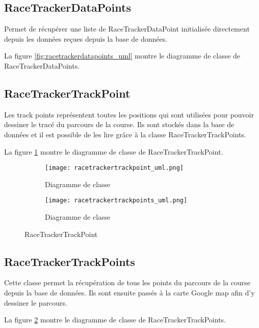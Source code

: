\subsection{RaceTrackerDataPoints}

Permet de récupérer une liste de RaceTrackerDataPoint initialisée directement depuis les données reçues depuis la base de données.

La figure \ref{fig:racetrackerdatapoints_uml} montre le diagramme de classe de RaceTrackerDataPoints.

\subsection{RaceTrackerTrackPoint}

Les track points représentent toutes les positions qui sont utilisées pour pouvoir dessiner le tracé du parcours de la course. Ils sont stockés dans la base de données et il est possible de les lire grâce à la classe RaceTrackerTrackPoints.

La figure \ref{fig:racetrackertrackpoint_uml} montre le diagramme de classe de RaceTrackerTrackPoint.
 
 \begin{figure}[htb!]
    \centering
    \begin{subfigure}[htb]{1\textwidth}
		\texttt{[image: racetrackertrackpoint\_uml.png]} 
		\caption{Diagramme de classe}
		\label{fig:racetrackertrackpoint_uml}
    \end{subfigure}
    \begin{subfigure}[htb]{1\textwidth}
		\texttt{[image: racetrackertrackpoints\_uml.png]} 
		\caption{Diagramme de classe}
		\label{fig:racetrackertrackpoints_uml}
    \end{subfigure}
    \caption{RaceTrackerTrackPoint}\label{fig:racetrackertrackpoint_fig}
\end{figure}

\subsection{RaceTrackerTrackPoints}

Cette classe permet la récupération de tous les points du parcours de la course depuis la base de données. Ils sont ensuite passés à la carte Google map afin d'y dessiner le parcours.

La figure \ref{fig:racetrackertrackpoints_uml} montre le diagramme de classe de RaceTrackerTrackPoints.

